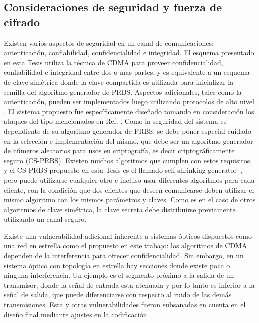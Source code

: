 \subsection{Consideraciones de seguridad y fuerza de cifrado}\label{Seguridad-fuerza}
Existen varios aspectos de seguridad en un canal de comunicaciones: autenticación, confiabilidad, confidencialidad e integridad.
El esquema presentado en esta Tesis utiliza la técnica de CDMA para proveer confidencialidad, confiabilidad e integridad entre dos o mas partes, y es equivalente a un esquema de clave simétrica donde la clave compartida es utilizada para inicializar la semilla del algoritmo generador de PRBS. Aspectos adicionales, tales como la autenticación, pueden ser implementados luego utilizando protocolos de alto nivel \cite{krawczyk2001order}.
El sistema propuesto fue específicamente diseñado tomando en consideración los ataques del tipo mencionados en Ref. \cite{Shake:05}.
Como la seguridad del sistema es dependiente de su algoritmo generador de PRBS, se debe poner especial cuidado en la selección e implementación del mismo, que debe ser un algoritmo generador de números aleatorios para usos en criptografía, es decir criptográficamente seguro (CS-PRBS). Existen muchos algoritmos que cumplen con estos requisitos, y el CS-PRBS propuesto en esta Tesis es el llamado self-shrinking generator~\cite{Meier:94}, pero puede utilizarse cualquier otro e incluso usar diferentes algoritmos para cada cliente, con la condición que dos clientes que deseen comunicarse deben utilizar el mismo algoritmo con los mismos parámetros y claves.
Como es en el caso de otros algoritmos de clave simétrica, la clave secreta debe distribuirse previamente utilizando un canal seguro.

Existe una vulnerabilidad adicional inherente a sistemas ópticos dispuestos como una red en estrella como el propuesto en este trabajo: los algoritmos de CDMA dependen de la interferencia para ofrecer confidencialidad. Sin embargo, en un sistema óptico con topología en estrella hay secciones donde existe poca o ninguna interferencia. Un ejemplo es el segmento próximo a la salida de un transmisor, donde la señal de entrada esta atenuada y por lo tanto es inferior a la señal de salida, que puede diferenciarse con respecto al ruido de las demás transmisiones.   
Esta y otras vulnerabilidades fueron subsanadas en cuenta en el diseño final mediante ajustes en la codificación.

